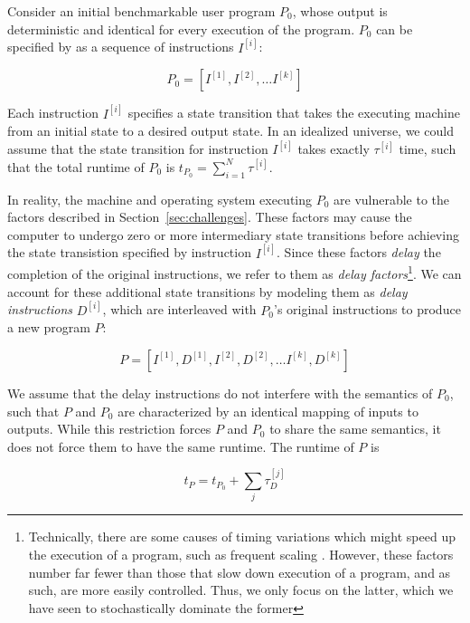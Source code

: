 \documentclass[conference]{IEEEtran}
\begin{document}
Consider an initial benchmarkable user program $P_0$, whose output is deterministic and
identical for every execution of the program. $P_0$ can be specified by as a sequence of
instructions $I^{[i]}$:

\begin{equation}
    P_0 = \left[I^{[1]}, I^{[2]}, \dots I^{[k]}\right]
\end{equation}

Each instruction $I^{[i]}$ specifies a state transition that takes the executing machine
from an initial state to a desired output state. In an idealized universe, we could assume
that the state transition for instruction $I^{[i]}$ takes exactly $\tau^{[i]}$ time, such
that the total runtime of $P_0$ is $t_{P_0} = \sum_{i=1}^N \tau^{[i]}$.

In reality, the machine and operating system executing $P_0$ are vulnerable to the factors
described in Section~\ref{sec:challenges}. These factors may cause the computer to undergo
zero or more intermediary state transitions before achieving the state transistion specified
by instruction $I^{[i]}$. Since these factors \textit{delay} the completion of the original
instructions, we refer to them as \textit{delay factors}\footnote{Technically, there are
some causes of timing variations which might speed up the execution of a program, such as
frequent scaling . However, these factors number far fewer than those that slow
down execution of a program, and as such, are more easily controlled. Thus, we only focus on
the latter, which we have seen to stochastically dominate the former }. We can account for these additional state transitions by modeling
them as \textit{delay instructions} $D^{[i]}$, which are interleaved with $P_0$'s original
instructions to produce a new program $P$:

\begin{equation}
    P = \left[I^{[1]}, D^{[1]}, I^{[2]}, D^{[2]}, \dots I^{[k]}, D^{[k]}\right]
\end{equation}

We assume that the delay instructions do not interfere with the semantics of $P_0$, such
that $P$ and $P_0$ are characterized by an identical mapping of inputs to outputs. While
this restriction forces $P$ and $P_0$ to share the same semantics, it does not force them
to have the same runtime. The runtime of $P$ is

\begin{equation}
    t_P = t_{P_0} + \sum_{j} \tau^{[j]}_D
\end{equation}
\end{document}

